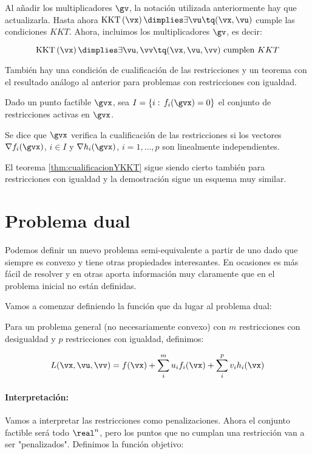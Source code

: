 \obs Al añadir los multiplicadores $\gv$, la notación utilizada anteriormente hay que actualizarla.
%
Hasta ahora $\KKT{\vx} \dimplies \exists \vu \tq (\vx,\vu)$ cumple las condiciones $KKT$.
%
Ahora, incluimos los multiplicadores $\gv$, es decir:

\[
	\KKT{\vx} \dimplies \exists \vu,\vv \tq (\vx,\vu,\vv) \text{ cumplen } KKT
\]

También hay una condición de cualificación de las restricciones y un teorema con el resultado análogo al anterior para problemas con restricciones con igualdad.


\begin{defn} 
Dado un punto factible $\gvx$, sea $I=\{i:\, f_i(\gvx)=0\}$ el conjunto de restricciones activas en $\gvx$.

Se dice que $\gvx$ verifica la cualificación de las restricciones si  los vectores $\nabla f_i(\gvx)$, $i\in I$ y $\nabla h_i(\gvx)$, $i=1,\ldots,p$ son linealmente independientes.
\end{defn}


El teorema \ref{thm:cualificacionYKKT} sigue siendo cierto también para restricciones con igualdad y la demostración sigue un esquema muy similar.


\section{Problema dual}

Podemos definir un nuevo problema semi-equivalente a partir de uno dado que siempre es convexo y tiene otras propiedades interesantes.
%
En ocasiones es más fácil de resolver y en otras aporta información muy claramente que en el problema inicial no están definidas. 


Vamos a comenzar definiendo la función que da lugar al problema dual:

\begin{defn}
Para un problema general (no necesariamente convexo) con $m$ restricciones con desigualdad y $p$ restricciones con igualdad, definimos:

\[
	L(\vx,\vu,\vv) = f(\vx) + \sum_i^m u_if_i(\vx) + \sum_i^p v_ih_i(\vx)
\]
\end{defn}

\paragraph{Interpretación:} Vamos a interpretar las restricciones como penalizaciones. Ahora el conjunto factible será todo $\real^n$, pero los puntos que no cumplan una restricción van a ser "penalizados". Definimos la función objetivo:

